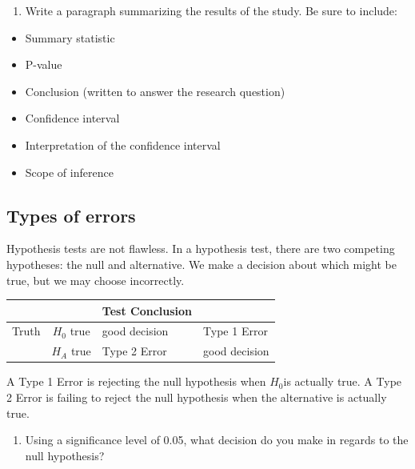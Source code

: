 \documentclass[
]{report}
\providecommand{\tightlist}{%
  \setlength{\itemsep}{0pt}\setlength{\parskip}{0pt}}
\begin{document}
\begin{enumerate}
\def\labelenumi{\arabic{enumi}.}
\setcounter{enumi}{24}
\tightlist
\item
  Write a paragraph summarizing the results of the study. Be sure to include:
\end{enumerate}

\begin{itemize}
\item
  Summary statistic
\item
  P-value
\item
  Conclusion (written to answer the research question)
\item
  Confidence interval
\item
  Interpretation of the confidence interval
\item
  Scope of inference
\end{itemize}

\vspace{3in}

\hypertarget{types-of-errors}{%
\subsection{Types of errors}\label{types-of-errors}}

Hypothesis tests are not flawless. In a hypothesis test, there are two competing hypotheses: the null and alternative. We make a decision about which might be true, but we may choose incorrectly.

\begin{longtable}[]{@{}ccll@{}}
\toprule
& & Test Conclusion &\tabularnewline
\midrule
\endhead
Truth & \(H_0\) true & good decision & Type 1 Error\tabularnewline
& \(H_A\) true & Type 2 Error & good decision\tabularnewline
\bottomrule
\end{longtable}

A Type 1 Error is rejecting the null hypothesis when \(H_0\)is actually true. A Type 2 Error is failing to reject the null hypothesis when the alternative is actually true.

\begin{enumerate}
\def\labelenumi{\arabic{enumi}.}
\setcounter{enumi}{25}
\tightlist
\item
  Using a significance level of 0.05, what decision do you make in regards to the null hypothesis?
\end{enumerate}

\vspace{0.5in}
\end{document}
